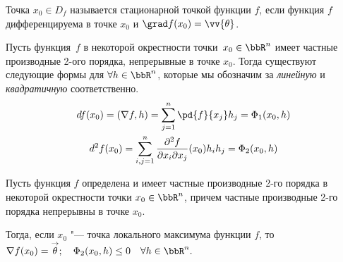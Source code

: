 \begin{defn}
Точка $x_0 \in D_f$ называется стационарной точкой функции $f$, если функция $f$ дифференцируема в точке $x_0$ и $\grad f(x_0) = \vv{\theta}$.
\end{defn}

Пусть функция~$f$ в некоторой окрестности точки~$x_0\in \bbR^n$ имеет частные производные 2-ого порядка, непрерывные в точке $x_0$. Тогда существуют следующие формы для $\forall h\in \bbR^n$, которые мы  обозначим за \textit{линейную} и \textit{квадратичную} соответственно.
\begin{gather}
df (x_0) = (\nabla f, h) = \sum_{j =1}^{n} \pd{f}{x_j}h_j = \Phi_1(x_0,h)   \\
d^2 f(x_0) = \sum_{i,j=1}^{n} \frac{\partial^2 f}{\partial x_i \partial x_j} (x_0) h_i h_j = \Phi_2 (x_0,h)
\end{gather}
 
\begin{thm}
Пусть функция $f$ определена и имеет частные производные 2-го порядка в некоторой окрестности точки $x_0 \in \bbR^n$, причем частные производные 2-го порядка непрерывны в точке $x_0$.

Тогда, если $x_0$ "--- точка локального максимума функции $f$, то $\nabla f(x_0) = \overset{\rightarrow}{\theta}; \quad \Phi_2(x_0, h) \le 0 \quad \forall h \in \bbR^n.$
\end{thm}

